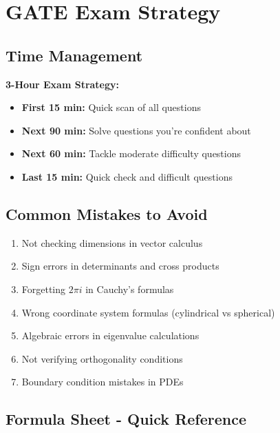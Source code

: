 \documentclass[12pt,a4paper]{article}
\theoremstyle{definition}
\begin{document}
\newpage
\section{GATE Exam Strategy}

\subsection{Time Management}

\begin{tipbox}
\textbf{3-Hour Exam Strategy:}
\begin{itemize}
    \item \textbf{First 15 min:} Quick scan of all questions
    \item \textbf{Next 90 min:} Solve questions you're confident about
    \item \textbf{Next 60 min:} Tackle moderate difficulty questions
    \item \textbf{Last 15 min:} Quick check and difficult questions
\end{itemize}
\end{tipbox}

\subsection{Common Mistakes to Avoid}

\begin{enumerate}
    \item Not checking dimensions in vector calculus
    \item Sign errors in determinants and cross products
    \item Forgetting $2\pi i$ in Cauchy's formulas
    \item Wrong coordinate system formulas (cylindrical vs spherical)
    \item Algebraic errors in eigenvalue calculations
    \item Not verifying orthogonality conditions
    \item Boundary condition mistakes in PDEs
\end{enumerate}

\subsection{Formula Sheet - Quick Reference}
\end{document}
